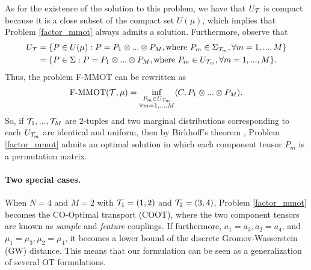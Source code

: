 As for the existence of the solution to this problem, we have that $U_{\mathcal T}$ is compact because it is a close subset of the
compact set $U(\mu)$, which implies that Problem \eqref{factor_mmot} always admits a solution. Furthermore, observe that
\begin{equation}
  \begin{split}
    U_{\mathcal T} &= \{ P \in U(\mu): P = P_1 \otimes ... \otimes P_M, \text{where } P_m \in \Sigma_{\mathcal T_m}, \forall m = 1,...,M \} \\
    &= \{ P \in \Sigma: P = P_1 \otimes ... \otimes P_M, \text{where } P_m \in U_{\mathcal T_m}, \forall m = 1,...,M \}.
  \end{split}
\end{equation}
Thus, the problem F-MMOT can be rewritten as
\begin{equation}
  \text{F-MMOT}( \mathcal T, \mu) = \inf_{\substack{P_m \in U_{\mathcal T_m} \\ \forall m = 1,...,M}}
  \langle C, P_1 \otimes ... \otimes P_M \rangle.
\end{equation}
So, if $\mathcal T_1,...,\mathcal T_M$ are $2$-tuples and two marginal distributions corresponding to each $U_{\mathcal T_m}$ are
identical and uniform, then by Birkhoff's theorem \citep{Birkhoff46}, Problem \eqref{factor_mmot} admits an optimal solution in
which each component tensor $P_m$ is a permutation matrix.

\paragraph{Two special cases.} When $N = 4$ and $M=2$ with $\mathcal T_1 = (1,2)$ and $\mathcal T_2 = (3,4)$, Problem
\eqref{factor_mmot} becomes the CO-Optimal transport (COOT), where the two component tensors are known as
\textit{sample} and \textit{feature} couplings. If furthermore, $a_1 = a_3, a_2=a_4$, and $\mu_1 = \mu_3, \mu_2=\mu_4$, it becomes a
lower bound of the discrete Gromov-Wasserstein (GW) distance. This means that our formulation can be seen as a
generalization of several OT formulations.


